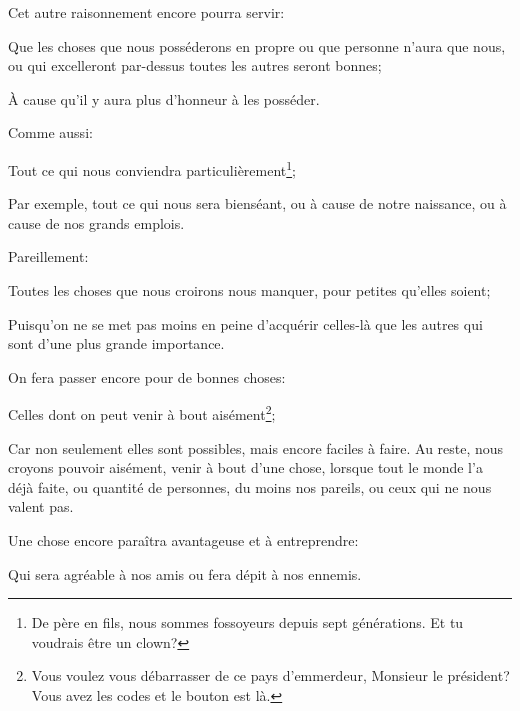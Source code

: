 \bigbreak

Cet autre raisonnement encore pourra servir:

\begin{lieu}
	Que les choses que nous posséderons en propre ou que personne n'aura que nous, ou qui excelleront par-dessus toutes les autres
	seront bonnes;
\end{lieu}

À cause qu'il y aura plus d'honneur à les posséder.

\bigbreak

Comme aussi:

\begin{lieu}
	Tout ce qui nous conviendra particulièrement\footnote{De père en fils, nous sommes fossoyeurs depuis sept générations. Et tu
	voudrais être un clown?};
\end{lieu}

Par exemple, tout ce qui nous sera bienséant, ou à cause de notre naissance, ou à cause de nos grands emplois.

\bigbreak

Pareillement:

\begin{lieu}
	Toutes les choses que nous croirons nous manquer, pour petites qu'elles soient;
\end{lieu}

Puisqu'on ne se met pas moins en peine d'acquérir celles-là que les autres qui sont d'une plus grande importance.

\bigbreak

On fera passer encore pour de bonnes choses:

\begin{lieu}
	Celles dont on peut venir à bout aisément\footnote{Vous voulez vous débarrasser de ce pays d'emmerdeur, Monsieur le
	président? Vous avez les codes et le bouton est là.};
\end{lieu}

Car non seulement elles sont possibles, mais encore faciles à faire. Au reste, nous croyons pouvoir aisément, venir à
bout d'une chose, lorsque tout le monde l'a déjà faite, ou quantité de personnes, du moins nos pareils, ou ceux qui ne
nous valent pas.

\bigbreak

Une chose encore paraîtra avantageuse et à entreprendre:

\begin{lieu}
	Qui sera agréable à nos amis ou fera dépit à nos ennemis.
\end{lieu}

